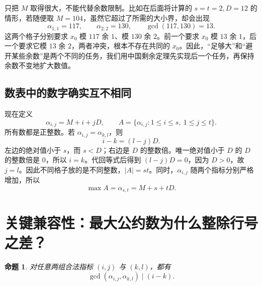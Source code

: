 \documentclass[UTF8,a4paper,oneside,openany,fontset=fandol,zihao=-4]{ctexbook}
\theoremstyle{guide}
\newtheorem{proposition}[theorem]{命题}
\begin{document}
只把 $M$ 取得很大，不能代替余数限制。比如在后面将计算的 $s=t=2,D=12$ 的情形，若随便取 $M=104$，虽然它超过了所需的大小界，却会出现
\[
\alpha_{1,1}=117,\qquad\alpha_{2,2}=130,
\qquad\gcd(117,130)=13.
\]
这两个格子分别要求 $x_0$ 模 $117$ 余 $1$、模 $130$ 余 $2$。前一个要求 $x_0$ 模 $13$ 余 $1$，后一个要求它模 $13$ 余 $2$，两者冲突，根本不存在共同的 $x_0$。因此，“足够大”和“避开某些余数”是两个不同的任务，我们用中国剩余定理先实现后一个任务，再保持余数不变地扩大数值。

\subsection{数表中的数字确实互不相同}

现在定义
\[
\alpha_{i,j}=M+i+jD,\qquad
A=\{\alpha_{i,j}:1\leq i\leq s,\ 1\leq j\leq t\}.
\]
所有数都是正整数。若 $\alpha_{i,j}=\alpha_{k,l}$，则
\[
i-k=(l-j)D.
\]
左边的绝对值小于 $s$，而 $s<D$；右边是 $D$ 的整数倍。唯一绝对值小于 $D$ 的 $D$ 的整数倍是 $0$，所以 $i=k$。代回等式后得到 $(l-j)D=0$，因为 $D>0$，故 $j=l$。因此不同格子放的是不同整数，$|A|=st$。同时，$\alpha_{i,j}$ 随两个指标分别严格增加，所以
\begin{equation}\label{up:maxA}
\max A=\alpha_{s,t}=M+s+tD.
\end{equation}

\section{关键兼容性：最大公约数为什么整除行号之差？}\label{up:gcd-section}

\begin{proposition}\label{up:gcd-compatibility}
对任意两组合法指标 $(i,j)$ 与 $(k,l)$，都有
\[
\gcd(\alpha_{i,j},\alpha_{k,l})\mid(i-k).
\]
\end{proposition}
\end{document}
